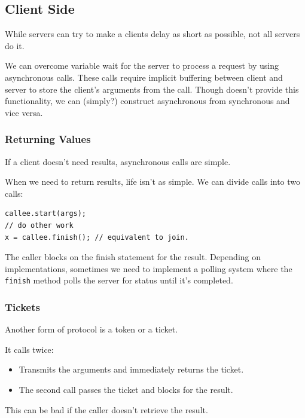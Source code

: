             \subsection{Client Side} %
            \label{sub:client_side}
                While servers can try to make a clients delay as short as possible, not all servers do it.

                We can overcome variable wait for the server to process a request by using asynchronous calls.
                These calls require implicit buffering between client and server to store the client's arguments from the call.
                Though \uC doesn't provide this functionality, we can (simply?) construct asynchronous from synchronous and vice versa.
                \subsubsection{Returning Values} %
                \label{ssub:returning_values}
                    If a client doesn't need results, asynchronous calls are simple.

                    When we need to return results, life isn't as simple.
                    We can divide calls into two calls:
                    \begin{lstlisting}
callee.start(args);
// do other work
x = callee.finish(); // equivalent to join.
                    \end{lstlisting}
                    The caller blocks on the finish statement for the result.
                    Depending on implementations, sometimes we need to implement a polling system where the \verb|finish| method polls the server for status until it's completed.
                \subsubsection{Tickets} %
                \label{ssub:tickets}
                    Another form of protocol is a token or a ticket.

                    It calls twice:

                    \begin{itemize}
                         \item Transmits the arguments and immediately returns the ticket.
                         \item The second call passes the ticket and blocks for the result.
                     \end{itemize}
                     This can be bad if the caller doesn't retrieve the result.
